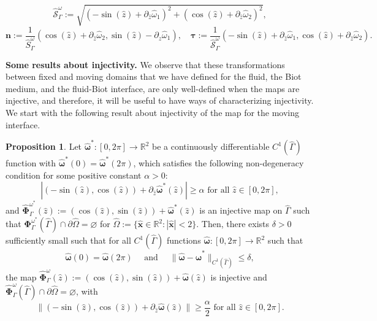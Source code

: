\documentclass[11pt]{article}
\newcommand{\bd}{\boldsymbol}
\def\R{{\mathbb R}}
\theoremstyle{definition}
\newtheorem{proposition}{Proposition}[section]
\begin{document}
\begin{equation*}
\hat{\mathcal{S}}^{\omega}_{\Gamma} := \sqrt{(-\sin(\hat{z}) + \partial_{\hat{z}}\hat{\omega}_{1})^{2} + (\cos(\hat{z}) + \partial_{\hat{z}} \hat{\omega}_{2})^{2}},
\end{equation*}
\begin{equation}\label{ntdef2}
\bd{n} := \frac{1}{\hat{S}^{\omega}_{\Gamma}} (\cos(\hat{z}) + \partial_{\hat{z}}\hat{\omega}_{2}, \sin(\hat{z}) - \partial_{\hat{z}}\hat{\omega}_{1}), \quad \bd{\tau} := \frac{1}{\hat{\mathcal{S}}^{\omega}_{\Gamma}}(-\sin(\hat{z}) + \partial_{\hat{z}}\hat{\omega}_{1}, \cos(\hat{z}) + \partial_{\hat{z}}\hat{\omega}_{2}).
\end{equation}

\medskip

\noindent \textbf{Some results about injectivity.} We observe that these transformations between fixed and moving domains that we have defined for the fluid, the Biot medium, and the fluid-Biot interface, are only well-defined when the maps are injective, and therefore, it will be useful to have ways of characterizing injectivity. We start with the following result about injectivity of the map for the moving interface.

\begin{proposition}\label{gammainjective}
Let $\hat{\bd{\omega}}^{*}: [0, 2\pi] \to \R^{2}$ be a continuously differentiable $C^{1}(\hat{\Gamma})$ function with $\hat{\bd{\omega}}^{*}(0) = \hat{\bd{\omega}}^{*}(2\pi)$, which satisfies the following non-degeneracy condition for some positive constant $\alpha > 0$:
\begin{equation*}
|(-\sin(\hat{z}), \cos(\hat{z})) + \partial_{\hat{z}}\hat{\bd{\omega}}^{*}(\hat{z})| \ge \alpha \text{ for all } \hat{z} \in [0, 2\pi],
\end{equation*}
and $\hat{\bd{\Phi}}^{\omega^{*}}_{\Gamma}(\hat{z}) := (\cos(\hat{z}), \sin(\hat{z})) + \hat{\bd{\omega}}^{*}(\hat{z})$ is an injective map on $\hat{\Gamma}$ such that $\bd{\Phi}^{\omega^{*}}_{\Gamma}(\hat{\Gamma}) \cap \partial \hat{\Omega} = \varnothing$ for $\hat{\Omega} := \{\hat{\bd{x}} \in \R^{2} : |\hat{\bd{x}}| < 2\}$. Then, there exists $\delta > 0$ sufficiently small such that for all $C^{1}(\hat{\Gamma})$ functions $\hat{\bd{\omega}}: [0, 2\pi] \to \R^{2}$ such that 
\begin{equation*}
\hat{\bd{\omega}}(0) = \hat{\bd{\omega}}(2\pi) \quad \text{ and } \quad \|\hat{\bd{\omega}} - \hat{\bd{\omega}}^{*}\|_{C^{1}(\hat{\Gamma})} \le \delta,
\end{equation*}
the map $\hat{\bd{\Phi}}^{\omega}_{\Gamma}(\hat{z}) := (\cos(\hat{z}), \sin(\hat{z})) + \hat{\bd{\omega}}(\hat{z})$ is injective and $\hat{\bd{\Phi}}^{\omega}_{\Gamma}(\hat{\Gamma}) \cap \partial \hat{\Omega} = \varnothing$, with 
\begin{equation}\label{nondegeneracy}
\|(-\sin(\hat{z}), \cos(\hat{z})) + \partial_{\hat{z}} \hat{\bd{\omega}}(\hat{z})\| \ge \frac{\alpha}{2} \text{ for all }\hat{z} \in [0, 2\pi].
\end{equation}

\end{proposition}
\end{document}
